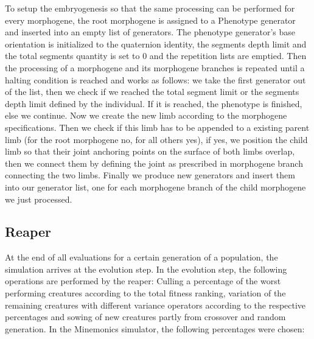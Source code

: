 \documentclass[main]{subfiles}
\begin{document}
To setup the embryogenesis so that the same processing can be performed for every morphogene, the root morphogene is assigned to a Phenotype generator and inserted into an empty list of generators. The phenotype generator's base orientation is initialized to the quaternion identity, the segments depth limit and the total segments quantity is set to 0 and the repetition lists are emptied. Then the processing of a morphogene and its morphogene branches is repeated until a halting condition is reached and works as follows: we take the first generator out of the list, then we check if we reached the total segment limit or the segments depth limit defined by the individual. If it is reached, the phenotype is finished, else we continue. Now we create the new limb according to the morphogene specifications. Then we check if this limb has to be appended to a existing parent limb (for the root morphogene no, for all others yes), if yes, we position the child limb so that their joint anchoring points on the surface of both limbs overlap, then we connect them by defining the joint as prescribed in morphogene branch connecting the two limbs. Finally we produce new generators and insert them into our generator list, one for each morphogene branch of the child morphogene we just processed. 

\subsection{Reaper}
\label{subsection:Reaper}

At the end of all evaluations for a certain generation of a population, the simulation arrives at the evolution step.  In the evolution step, the following operations are performed by the reaper: Culling a percentage of the worst performing creatures according to the total fitness ranking, variation of the remaining creatures with different variance operators according to the respective percentages and sowing of new creatures partly from crossover and random generation. In the Minemonics simulator, the following percentages were chosen:
\end{document}

